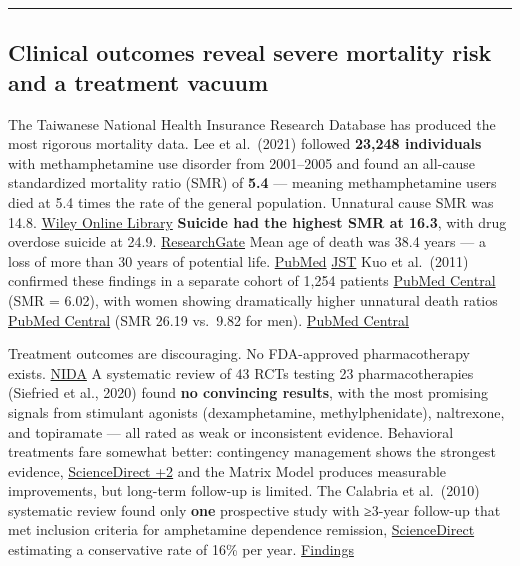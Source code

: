 \begin{center}\rule{0.5\linewidth}{0.5pt}\end{center}

\subsection{Clinical outcomes reveal severe mortality risk and a treatment vacuum}\label{14_what_we_dont_know-clinical-outcomes-reveal-severe-mortality-risk-and-a-treatment-vacuum}

The Taiwanese National Health Insurance Research Database has produced the most rigorous mortality data. Lee et al.~(2021) followed \textbf{23,248 individuals} with methamphetamine use disorder from 2001--2005 and found an all-cause standardized mortality ratio (SMR) of \textbf{5.4} --- meaning methamphetamine users died at 5.4 times the rate of the general population. Unnatural cause SMR was 14.8. \href{https://onlinelibrary.wiley.com/doi/abs/10.1111/add.15501}{Wiley Online Library} \textbf{Suicide had the highest SMR at 16.3}, with drug overdose suicide at 24.9. \href{https://www.researchgate.net/publication/41423198_Three-year_mortality_and_predictors_after_release_A_longitudinal_study_of_the_first-time_drug_offenders_in_Taiwan}{ResearchGate} Mean age of death was 38.4 years --- a loss of more than 30 years of potential life. \href{https://pubmed.ncbi.nlm.nih.gov/38462530/}{PubMed} \href{https://www.jstage.jst.go.jp/article/jea/34/10/34_JE20230263/_article}{JST} Kuo et al.~(2011) confirmed these findings in a separate cohort of 1,254 patients \href{https://pmc.ncbi.nlm.nih.gov/articles/PMC3117111/}{PubMed Central} (SMR = 6.02), with women showing dramatically higher unnatural death ratios \href{https://pmc.ncbi.nlm.nih.gov/articles/PMC3117111/}{PubMed Central} (SMR 26.19 vs.~9.82 for men). \href{https://pmc.ncbi.nlm.nih.gov/articles/PMC3117111/}{PubMed Central}

Treatment outcomes are discouraging. No FDA-approved pharmacotherapy exists. \href{https://nida.nih.gov/publications/drugs-brains-behavior-science-addiction/treatment-recovery}{NIDA} A systematic review of 43 RCTs testing 23 pharmacotherapies (Siefried et al., 2020) found \textbf{no convincing results}, with the most promising signals from stimulant agonists (dexamphetamine, methylphenidate), naltrexone, and topiramate --- all rated as weak or inconsistent evidence. Behavioral treatments fare somewhat better: contingency management shows the strongest evidence, \href{https://www.sciencedirect.com/science/article/abs/pii/S009174352300230X}{ScienceDirect +2} and the Matrix Model produces measurable improvements, but long-term follow-up is limited. The Calabria et al.~(2010) systematic review found only \textbf{one} prospective study with ≥3-year follow-up that met inclusion criteria for amphetamine dependence remission, \href{https://www.sciencedirect.com/science/article/abs/pii/S0306460310000985}{ScienceDirect} estimating a conservative rate of 16\% per year. \href{https://findings.org.uk/PHP/dl.php?f=Calabria_B_1.cab&s=dd&sf=mx}{Findings}

